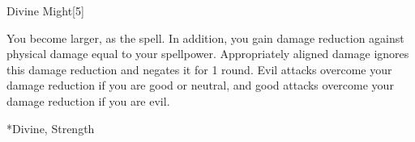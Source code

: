 \begin{spellsection}{Divine Might}[5]
    \begin{spellheader}
    \end{spellheader}
    \begin{spellcontent}
        \begin{spelltargetinginfo}
        \end{spelltargetinginfo}
        \begin{spelleffects}
            \spelleffect You become larger, as the  spell.
            In addition, you gain damage reduction against physical damage equal to your spellpower.
            Appropriately aligned damage ignores this damage reduction and negates it for 1 round.
            Evil attacks overcome your damage reduction if you are good or neutral, and good attacks overcome your damage reduction if you are evil.
            \spelldur \durshort \dismissable
        \end{spelleffects}
    \end{spellcontent}
    \begin{spellfooter}
        *{Divine, Strength}
        \spellnotes \sizingspellnotes
        \miscastexplode
    \end{spellfooter}
\end{spellsection}

